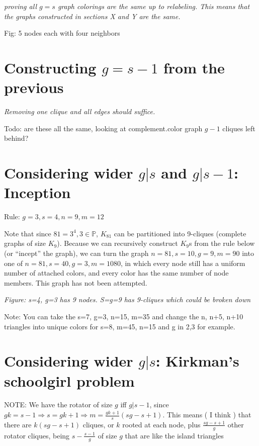 \documentclass[11pt, oneside]{article} 	%
\begin{document}
\emph{proving all $g=s$ graph colorings are the same up to relabeling.  This means that the  graphs constructed in sections X and Y are the same.}


Fig: 5 nodes each with four neighbors



\section{Constructing $g=s-1$ from the previous}

\emph{Removing one clique and all edges should suffice.}

Todo: are these all the same, looking at complement.color graph $g-1$ cliques left behind?



\section{Considering wider $g | s$ and $g | s-1$: Inception}

Rule: $g=3, s=4, n=9, m=12$

Note that since $81 = 3^4, 3 \in \mathbb{P}$, $K_{81}$ can be partitioned into 9-cliques (complete graphs of size $K_9$).  Because we can recursively construct $K_9$s from the rule below (or ``incept'' the graph), we can turn the graph $n=81, s=10, g=9, m=90$ into one of $n=81, s=40, g=3, m=1080$, in which every node still has a uniform number of attached colors, and every color has the same number of node members.  This graph has not been attempted.

\emph{Figure: s=4, g=3 has 9 nodes.  S=g=9 has 9-cliques which could be broken down }

Note: You can take the s=7, g=3, n=15, m=35 and change the n, n+5, n+10 triangles into unique colors for s=8, m=45, n=15 and g in {2,3} for example.  


\section{Considering wider $g|s$: Kirkman's schoolgirl problem}

NOTE: We have the rotator of size $g$ iff $g | s-1$, since $gk = s - 1 \Rightarrow s = gk+1 \Rightarrow m = \frac{gk+1}{s}(sg-s+1).$  This means ( I think ) that there are $k(sg-s+1)$ cliques, or $k$ rooted at each node, plus $\frac{sg-s+1}{g}$ other rotator cliques, being $s - \frac{s-1}g$ of size $g$ that are like the island triangles
\end{document}
